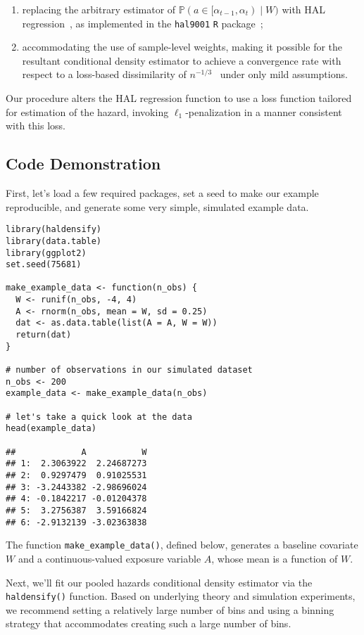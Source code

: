 \begin{enumerate}
  \item replacing the arbitrary estimator of $\mathbb{P}(a \in [\alpha_{t-1},
      \alpha_t) \mid W)$ with HAL regression~\citep{vdl2015generally,
      benkeser2016highly,vdl2017generally}, as implemented in the
      \texttt{hal9001} \texttt{R} package~\citep{coyle2021hal9001,
      hejazi2020hal9001};
  \item accommodating the use of sample-level weights, making it possible for
     the resultant conditional density estimator to achieve a convergence rate
     with respect to a loss-based dissimilarity of
     $n^{-1/3}$~\citep{bibaut2019fast} under only mild assumptions.
\end{enumerate}

Our procedure alters the HAL regression function to use a loss function tailored
for estimation of the hazard, invoking $\ell_1$-penalization in a manner
consistent with this loss.

\subsection{Code Demonstration}

First, let's load a few required packages, set a seed to make our example
reproducible, and generate some very simple, simulated example data.

\begin{lstlisting}
library(haldensify)
library(data.table)
library(ggplot2)
set.seed(75681)

make_example_data <- function(n_obs) {
  W <- runif(n_obs, -4, 4)
  A <- rnorm(n_obs, mean = W, sd = 0.25)
  dat <- as.data.table(list(A = A, W = W))
  return(dat)
}

# number of observations in our simulated dataset
n_obs <- 200
example_data <- make_example_data(n_obs)

# let's take a quick look at the data
head(example_data)

##             A           W
## 1:  2.3063922  2.24687273
## 2:  0.9297479  0.91025531
## 3: -3.2443382 -2.98696024
## 4: -0.1842217 -0.01204378
## 5:  3.2756387  3.59166824
## 6: -2.9132139 -3.02363838
\end{lstlisting}

The function \texttt{make\_example\_data()}, defined below, generates a baseline
covariate $W$ and a continuous-valued exposure variable $A$, whose mean is a
function of $W$.

Next, we'll fit our pooled hazards conditional density estimator via the
\texttt{haldensify()} function. Based on underlying theory and simulation
experiments, we recommend setting a relatively large number of bins and using a
binning strategy that accommodates creating such a large number of bins.

